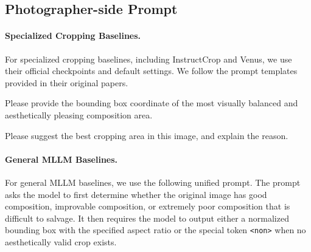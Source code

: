 \documentclass{article} %
\begin{document}
\subsection{Photographer-side Prompt}
\label{app:photographer_side_baseline_prompt}

\paragraph{Specialized Cropping Baselines.}
For specialized cropping baselines, including InstructCrop and Venus, we use their official checkpoints and default settings. We follow the prompt templates provided in their original papers.

\begin{promptbox}
\small
Please provide the bounding box coordinate of the most visually balanced and aesthetically pleasing composition area.
\end{promptbox}

\begin{promptbox}
\small
Please suggest the best cropping area in this image, and explain the reason.
\end{promptbox}

\paragraph{General MLLM Baselines.}
For general MLLM baselines, we use the following unified prompt. The prompt asks the model to first determine whether the original image has good composition, improvable composition, or extremely poor composition that is difficult to salvage. It then requires the model to output either a normalized bounding box with the specified aspect ratio or the special token \texttt{<non>} when no aesthetically valid crop exists.
\end{document}
